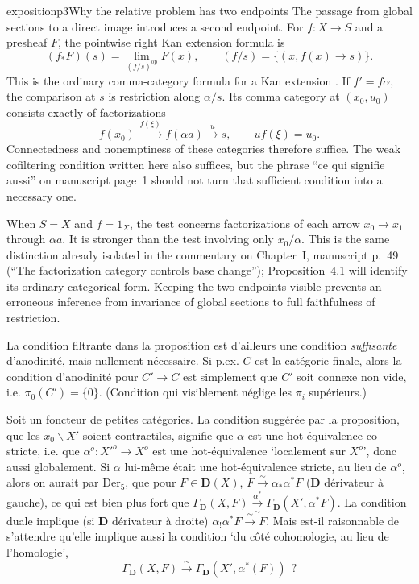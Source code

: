 \begin{dcomment}{exposition}{p3}{Why the relative problem has two endpoints}
The passage from global sections to a direct image introduces a second endpoint. For $f:X\to S$ and a presheaf $F$, the pointwise right Kan extension formula is
\[
 (f_*F)(s)=\lim_{(f/s)^{\mathrm{op}}}F(x),
 \qquad (f/s)=\{(x,f(x)\to s)\}.
\]
This is the ordinary comma-category formula for a Kan extension \citep[Theorem~6.2.1 and Corollary~6.2.9]{Riehl2016}. If $f'=f\alpha$, the comparison at $s$ is restriction along $\alpha/s$. Its comma category at $(x_0,u_0)$ consists exactly of factorizations
\[
 f(x_0)\xrightarrow{\,f(\xi)\,}f(\alpha a)
 \xrightarrow{\,u\,}s,
 \qquad u f(\xi)=u_0.
\]
Connectedness and nonemptiness of these categories therefore suffice. The weak cofiltering condition written here also suffices, but the phrase ``ce qui signifie aussi'' on manuscript page~1 should not turn that sufficient condition into a necessary one.

When $S=X$ and $f=1_X$, the test concerns factorizations of each arrow $x_0\to x_1$ through $\alpha a$. It is stronger than the test involving only $x_0/\alpha$. This is the same distinction already isolated in the commentary on Chapter~I, manuscript p.~49 (``The factorization category controls base change''); Proposition~4.1 will identify its ordinary categorical form. Keeping the two endpoints visible prevents an erroneous inference from invariance of global sections to full faithfulness of restriction.
\end{dcomment}


La condition filtrante dans la proposition est d'ailleurs une condition \textit{suffisante} d'anodinité, mais nullement nécessaire. Si p.ex. $C$ est la catégorie finale, alors la condition d'anodinité pour $C' \longrightarrow C$ est simplement que $C'$ soit connexe non vide, i.e. $\pi_0(C') = \{0\}$. (Condition qui visiblement néglige les $\pi_i$ supérieurs.)

Soit  un foncteur de petites catégories. La condition suggérée par la proposition, que les $x_0\backslash X'$ soient contractiles, signifie que $\alpha$ est une hot-équivalence co-stricte, i.e. que $\alpha^{o} : X'^{o} \longrightarrow X^{o}$ est une hot-équivalence `localement sur $X^{o}$', donc aussi globalement. Si $\alpha$
lui-même était une hot-équivalence stricte, au lieu de $\alpha^{o}$, alors on aurait par $\mathrm{Der}_5$, que pour $F \in \mathbf{D}(X)$, $F \xrightarrow{\;\sim\;} \alpha_*\alpha^* F$ ($\mathbf{D}$ dérivateur à gauche), ce qui est bien plus fort que $\Gamma_{\mathbf{D}}(X, F) \xrightarrow[\sim]{\alpha^*} \Gamma_{\mathbf{D}}(X', \alpha^* F)$. La condition duale implique (si $\mathbf{D}$ dérivateur à droite) $\alpha_!\alpha^* F \xrightarrow{\;\sim\;} F$. Mais est-il raisonnable de s'attendre qu'elle implique aussi la condition `du côté cohomologie, au lieu de l'homologie',
\[ \Gamma_{\mathbf{D}}(X, F) \xrightarrow{\;\sim\;} \Gamma_{\mathbf{D}}(X', \alpha^*(F)) \ \ ? \]

